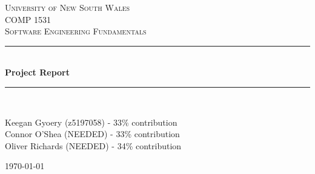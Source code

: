 \documentclass[a4paper]{article}
\begin{document}
\newlength{\strutheight}
\settoheight{\strutheight}{\strut}

\begin{titlepage}

\newcommand{\HRule}{\rule{\linewidth}{0.5mm}} %

\center %
 
\textsc{\LARGE University of New South Wales}\\[1.5cm] %
\textsc{\Large COMP 1531}\\[0.5cm] %
\textsc{\large Software Engineering Fundamentals}\\[0.5cm] %

\HRule \\[0.4cm]
{ \huge \bfseries Project Report}\\[0.4cm] %
\HRule \\[1.5cm]


\begin{center} \large
Keegan Gyoery (z5197058) - 33\% contribution \\
Connor O'Shea (NEEDED) - 33\% contribution\\ 
Oliver Richards (NEEDED) - 34\% contribution\\
\end{center}


\vspace{4cm}

{\today}\\[3cm] %

\vfill %

\end{titlepage}


\tableofcontents

\pagebreak
\end{document}
